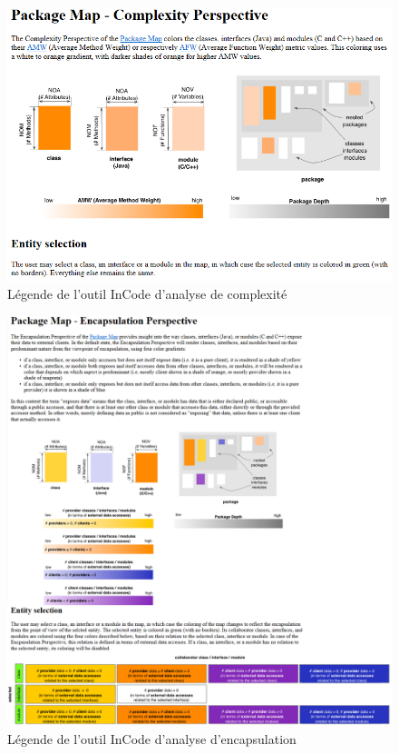 \documentclass[12pt,a4paper,final]{article}
\begin{document}
\begin{figure}[ht]
	\centering
	\includegraphics[width=\textwidth]{images/InCodeComplexityLegende.png}
	\caption{\label{complexityLeg}Légende de l'outil InCode d'analyse de complexité}
\end{figure}

\begin{figure}[ht]
	\centering
	\includegraphics[width=\textwidth]{images/InCodeEncapsulationLegende.png}
	\caption{\label{encapsulationLeg}Légende de l'outil InCode d'analyse d'encapsulation}
\end{figure}
\end{document}
